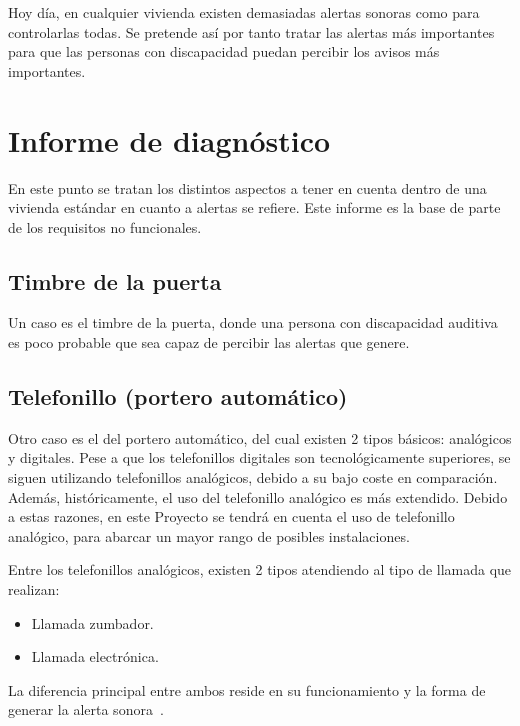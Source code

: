 Hoy día, en cualquier vivienda existen demasiadas alertas sonoras como para controlarlas todas. Se pretende así por tanto tratar las alertas más importantes para que las personas con discapacidad puedan percibir los avisos más importantes.

\section{Informe de diagnóstico}
\label{sec:informediagnostico}

En este punto se tratan los distintos aspectos a tener en cuenta dentro de una vivienda estándar en cuanto a alertas se refiere. Este informe es la base de parte de los requisitos no funcionales.

    \subsection{Timbre de la puerta}

    Un caso es el timbre de la puerta, donde una persona con discapacidad auditiva es poco probable que sea capaz de percibir las alertas que genere.

    \subsection{Telefonillo (portero automático)}

    Otro caso es el del portero automático, del cual existen 2 tipos básicos: analógicos y digitales. Pese a que los telefonillos digitales son tecnológicamente superiores, se siguen utilizando telefonillos analógicos, debido a su bajo coste en comparación. Además, históricamente, el uso del telefonillo analógico es más extendido. Debido a estas razones, en este Proyecto se tendrá en cuenta el uso de telefonillo analógico, para abarcar un mayor rango de posibles instalaciones.

    Entre los telefonillos analógicos, existen 2 tipos atendiendo al tipo de llamada que realizan:
    \begin{itemize}
        \item Llamada zumbador.
        \item Llamada electrónica.
    \end{itemize}

    La diferencia principal entre ambos reside en su funcionamiento y la forma de generar la alerta sonora~\cite{llamadatelefonillo}.

